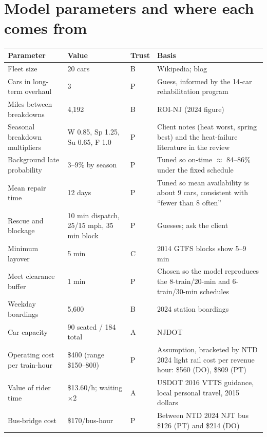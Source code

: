 \documentclass[11pt]{article}
\begin{document}
\section{Model parameters and where each comes from}

\begin{longtable}{@{}p{4.2cm}p{2.2cm}p{1.0cm}p{6.4cm}@{}}
\toprule
Parameter & Value & Trust & Basis \\
\midrule
\endhead
Fleet size & 20 cars & B & Wikipedia; blog \\
Cars in long-term overhaul & 3 & P & Guess, informed by the 14-car rehabilitation program \\
Miles between breakdowns & 4{,}192 & B & ROI-NJ (2024 figure) \\
Seasonal breakdown multipliers & W 0.85, Sp 1.25, Su 0.65, F 1.0 & P & Client notes (heat worst, spring best) and the heat-failure literature in the review \\
Background late probability & 3--9\% by season & P & Tuned so on-time $\approx$ 84--86\% under the fixed schedule \\
Mean repair time & 12 days & P & Tuned so mean availability is about 9 cars, consistent with ``fewer than 8 often'' \\
Rescue and blockage & 10 min dispatch, 25/15 mph, 35 min block & P & Guesses; ask the client \\
Minimum layover & 5 min & C & 2014 GTFS blocks show 5--9 min \\
Meet clearance buffer & 1 min & P & Chosen so the model reproduces the 8-train/20-min and 6-train/30-min schedules \\
Weekday boardings & 5{,}600 & B & 2024 station boardings \\
Car capacity & 90 seated / 184 total & A & NJDOT \\
Operating cost per train-hour & \$400 (range \$150--800) & P & Assumption, bracketed by NTD 2024 light rail cost per revenue hour: \$560 (DO), \$809 (PT) \\
Value of rider time & \$13.60/h; waiting $\times 2$ & A & USDOT 2016 VTTS guidance, local personal travel, 2015 dollars \\
Bus-bridge cost & \$170/bus-hour & P & Between NTD 2024 NJT bus \$126 (PT) and \$214 (DO) \\
\bottomrule
\end{longtable}

\end{document}

